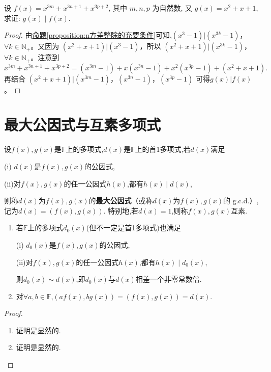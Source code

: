\documentclass[lang=cn,newtx,10pt,scheme=chinese]{elegantbook}
\begin{document}
\begin{example}
设 \(f(x)=x^{3m}+x^{3n + 1}+x^{3p+2}\), 其中 \(m,n,p\) 为自然数, 又 \(g(x)=x^{2}+x + 1\), 求证: \(g(x)\mid f(x)\).
\end{example}
\begin{proof}
由\hyperref[proposition:n方差整除的充要条件]{命题\ref{proposition:n方差整除的充要条件}}可知,\((x^3 - 1)|(x^{3k} - 1)\)，\(\forall k\in \mathbb{N}_+\)。又因为 \((x^2 + x + 1)|(x^3 - 1)\)，所以 \((x^2 + x + 1)|(x^{3k} - 1)\)，\(\forall k\in \mathbb{N}_+\)。注意到
\[
x^{3m}+x^{3n + 1}+x^{3p + 2}=(x^{3m}-1)+x(x^{3n}-1)+x^2(x^{3p}-1)+(x^2 + x + 1).
\]
再结合 \((x^2 + x + 1)|(x^{3m}-1)\)，\((x^{3n}-1)\)，\((x^{3p}-1)\) 可得\(g(x)|f(x)\)。
\end{proof}




\section{最大公因式与互素多项式}

\begin{definition}[最大公因式和互素]\label{definition:最大公因式和互素}
设\(f(x),g(x)\)是\(\mathbb{F}\)上的多项式,$d(x)$是\(\mathbb{F}\)上的首1多项式,若\(d(x)\)满足

(i)$\,\,d(x)$是\(f(x),g(x)\)的公因式,

(ii)对\(f(x),g(x)\)的任一公因式\(h(x)\),都有\(h(x)\mid d(x)\),

则称\(d(x)\)为\(f(x),g(x)\)的\textbf{最大公因式}（或称\(d(x)\)为\(f(x),g(x)\)的 g.c.d.）,记为\(d(x)=(f(x),g(x))\).
特别地,若\(d(x)=1\),则称\(f(x),g(x)\)互素.
\end{definition}

\begin{proposition}\label{proposition:最大公因式的小结论}
\begin{enumerate}[(1)]
\item 若$\mathbb{F}$上的多项式$d_0(x)$(但不一定是首1多项式)也满足

(i)$\,\,d_0(x)$是\(f(x),g(x)\)的公因式,

(ii)对\(f(x),g(x)\)的任一公因式\(h(x)\),都有\(h(x)\mid d_0(x)\),

则$d_0(x)\sim d(x)$,即$d_0(x)$与$d(x)$相差一个非零常数倍.

\item 对$\forall a,b\in\mathbb{F}$,$(af(x),bg(x))=(f(x),g(x))=d(x)$.
\end{enumerate}
\end{proposition}
\begin{proof}
\begin{enumerate}[(1)]
\item 证明是显然的.

\item 证明是显然的.
\end{enumerate}
\end{proof}
\end{document}
